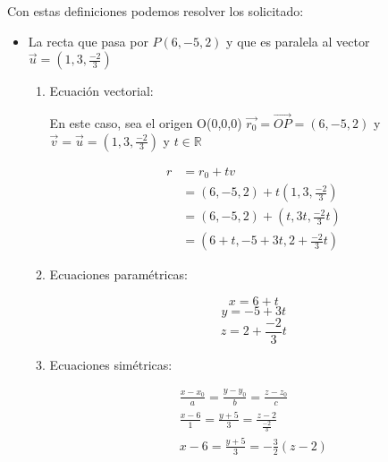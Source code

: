 \documentclass[12pt]{article}
\begin{document}
Con estas definiciones podemos resolver los solicitado:

\begin {itemize}
  
\item La recta que pasa por $P(6,-5,2)$ y que es paralela al vector $\vec{u}=(1,3,\frac{-2}{3})$
  
  \begin{enumerate}
  \item Ecuación vectorial:
    
    En este caso, sea el origen O(0,0,0) $\vec{r_0} = \vec{OP} = (6, -5, 2)$  y  $\vec{v} = \vec{u} = (1,3,\frac{-2}{3})  $ y $t \in \mathds{R} $
    
    \begin{equation*}
      \begin{split}
        r &= r_0 + tv \\
        &= (6, -5, 2)  + t(1,3,\frac{-2}{3}) \\
        &= (6, -5, 2)  + (t,3t,\frac{-2}{3}t)\\
        &= (6+t, -5+3t, 2 + \frac{-2}{3}t)
      \end{split}
    \end{equation*}
    
  \item Ecuaciones paramétricas:
    
    $$x = 6+t $$
    $$y = -5+3t$$
    $$z =  2 + \frac{-2}{3}t $$
    
  \item Ecuaciones simétricas:
    
    \begin{equation*}
      \begin{split}
        \frac{x-x_0}{a} = \frac{y-y_0}{b} = \frac{z-z_0}{c} \\
        \frac{x-6}{1} = \frac{y+5}{3} = \frac{z-2}{\frac{-2}{3}} \\
        x-6 = \frac{y+5}{3} = -\frac{3}{2}(z-2) \\
      \end{split}
    \end{equation*}
    
  \end{enumerate}
  
\end{itemize}
\end{document}
